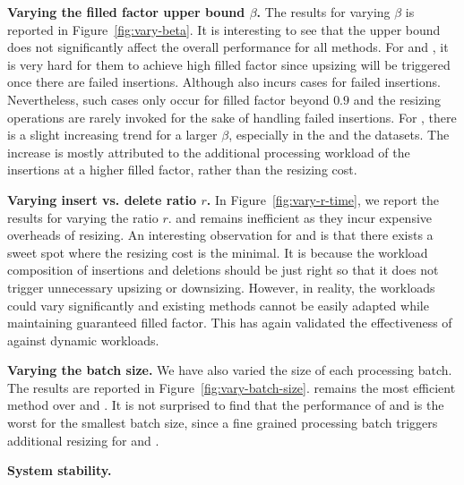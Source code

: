 \vspace{1mm}\noindent\textbf{Varying the filled factor upper bound $\beta$.}
The results for varying $\beta$ is reported in Figure~\ref{fig:vary-beta}. 
It is interesting to see that the upper bound does not significantly affect the overall performance for all methods. 
For \linear and \megakv, it is very hard for them to achieve high filled factor since upsizing will be triggered once there are failed insertions.
Although \voter also incurs cases for failed insertions. Nevertheless, such cases only occur for filled factor beyond $0.9$ and the resizing operations are rarely invoked for the sake of handling failed insertions. 
For \voter, there is a slight increasing trend for a larger $\beta$, especially in the \dsreddit and the \dsrandom datasets. 
The increase is mostly attributed to the additional processing workload of the insertions at a higher filled factor, rather than the resizing cost. 



\vspace{1mm}\noindent\textbf{Varying insert vs. delete ratio $r$.}
In Figure~\ref{fig:vary-r-time}, we report the results for varying the ratio $r$. \linear and \megakv remains inefficient as they incur expensive overheads of resizing. An interesting observation for \linear and \megakv is that there exists a sweet spot where the resizing cost is the minimal.
It is because the workload composition of insertions and deletions should be just right so that it does not trigger unnecessary upsizing or downsizing. However, in reality, the workloads could vary significantly and existing methods cannot be easily adapted while maintaining guaranteed filled factor. This has again validated the effectiveness of \voter against dynamic workloads.



\vspace{1mm}\noindent\textbf{Varying the batch size.}
We have also varied the size of each processing batch. The results are reported in Figure~\ref{fig:vary-batch-size}. \voter remains the most efficient method over \linear and \megakv. It is not surprised to find that the performance of \linear and \megakv is the worst for the smallest batch size, since a fine grained processing batch triggers additional resizing for \linear and \megakv. 



\vspace{1mm}\noindent\textbf{System stability.}



